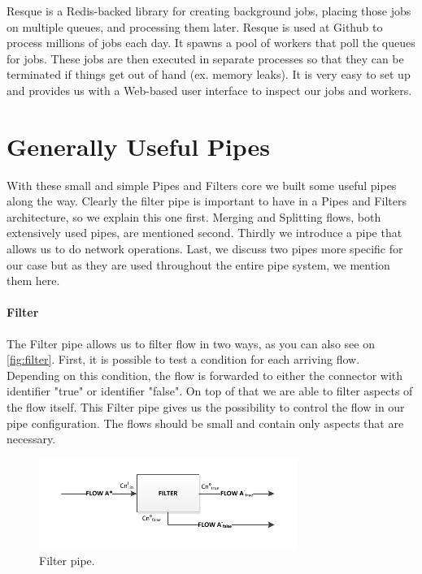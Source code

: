 Resque is a Redis-backed library for creating background jobs, placing those jobs on multiple queues, and processing them later. Resque is used at Github to process millions of jobs each day. It spawns a pool of workers that poll the queues for jobs. These jobs are then executed in separate processes so that they can be terminated if things get out of hand (ex. memory leaks). It is very easy to set up and provides us with a Web-based user interface to inspect our jobs and workers.

\section{Generally Useful Pipes}

With these small and simple Pipes and Filters core we built some useful pipes along the way. Clearly the filter pipe is important to have in a Pipes and Filters architecture, so we explain this one first. Merging and Splitting flows, both extensively used pipes, are mentioned second. Thirdly we introduce a pipe that allows us to do network operations. Last, we discuss two pipes more specific for our case but as they are used throughout the entire pipe system, we mention them here.

\paragraph{Filter} \label{par:filterpipe} The Filter pipe allows us to filter flow in two ways, as you can also see on \autoref{fig:filter}. First, it is possible to test a condition for each arriving flow. Depending on this condition, the flow is forwarded to either the connector with identifier "true" or identifier "false". On top of that we are able to filter aspects of the flow itself. This Filter pipe gives us the possibility to control the flow in our pipe configuration. The flows should be small and contain only aspects that are necessary.

\begin{figure}[htp]
	\centering
		\includegraphics[width=0.75\textwidth]{fig/filter}
	\caption{Filter pipe.}
	\label{fig:filter}
\end{figure}

